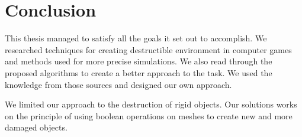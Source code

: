 \chapter*{Conclusion}

This thesis managed to satisfy all the goals it set out to accomplish. We researched techniques for creating destructible environment in computer games and methods used for more precise simulations. We also read through the proposed algorithms to create a better approach to the task. We used the knowledge from those sources and designed our own approach.

We limited our approach to the destruction of rigid objects. Our solutions works on the principle of using boolean operations on meshes to create new and more damaged objects. 